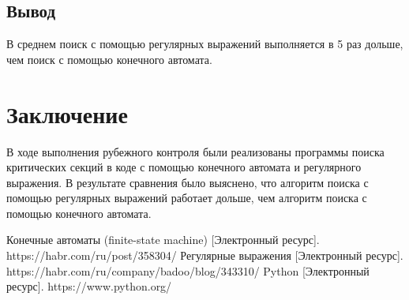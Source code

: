 \documentclass[12pt, a4paper]{report}
\begin{document}
	\section{Вывод}
	В среднем поиск с помощью регулярных выражений выполняется в 5 раз дольше, чем поиск с помощью конечного автомата.

	\chapter*{Заключение}
	\hspace{0.5cm}В ходе выполнения рубежного контроля были реализованы программы поиска критических секций в коде с помощью конечного автомата и регулярного выражения. В результате сравнения было выяснено, что алгоритм поиска с помощью регулярных выражений работает дольше, чем алгоритм поиска с помощью конечного автомата.
	
	\newpage
	
	\begin{thebibliography}{}
	 Конечные автоматы (finite-state machine) [Электронный ресурс]. https://habr.com/ru/post/358304/
	 Регулярные выражения [Электронный ресурс].  https://habr.com/ru/company/badoo/blog/343310/
	 Python [Электронный ресурс]. https://www.python.org/
	\end{thebibliography}
\end{document}
